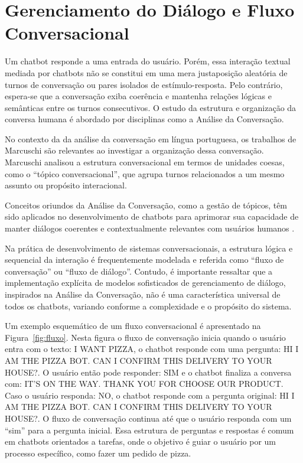 \documentclass[14pt,a4paper,oneside]{book}
\begin{document}
\section{Gerenciamento do Diálogo e Fluxo Conversacional}

Um chatbot responde a uma entrada do usuário. Porém, essa interação textual mediada por chatbots não se constitui em uma mera justaposição aleatória de turnos de conversação ou pares isolados de estímulo-resposta. Pelo contrário, espera-se que a conversação exiba coerência e mantenha relações lógicas e semânticas entre os turnos consecutivos. O estudo da estrutura e organização da conversa humana é abordado por disciplinas como a Análise da Conversação.

No contexto da da análise da conversação em língua portuguesa, os trabalhos de Marcuschi \cite{Marchuschi1986} são relevantes ao investigar a organização dessa conversação. Marcuschi analisou a estrutura conversacional em termos de unidades coesas, como o ``tópico conversacional'', que agrupa turnos relacionados a um mesmo assunto ou propósito interacional.

Conceitos oriundos da Análise da Conversação, como a gestão de tópicos, têm sido aplicados no desenvolvimento de chatbots para aprimorar sua capacidade de manter diálogos coerentes e contextualmente relevantes com usuários humanos \cite{Neves2005}.

Na prática de desenvolvimento de sistemas conversacionais, a estrutura lógica e sequencial da interação é frequentemente modelada e referida como ``fluxo de conversação'' ou ``fluxo de diálogo''. Contudo, é importante ressaltar que a implementação explícita de modelos sofisticados de gerenciamento de diálogo, inspirados na Análise da Conversação, não é uma característica universal de todos os chatbots, variando conforme a complexidade e o propósito do sistema. 

Um exemplo esquemático de um fluxo conversacional é apresentado na Figura~\ref{fig:fluxo}. Nesta figura o fluxo de conversação inicia quando o usuário entra com o texto: I WANT PIZZA, o chatbot responde com uma pergunta: HI I AM THE PIZZA BOT. CAN I CONFIRM THIS DELIVERY TO YOUR HOUSE?. O usuário então pode responder: SIM e o chatbot finaliza a conversa com: IT'S ON THE WAY. THANK YOU FOR CHOOSE OUR PRODUCT. Caso o usuário responda: NO, o chatbot responde com a pergunta original: HI I AM THE PIZZA BOT. CAN I CONFIRM THIS DELIVERY TO YOUR HOUSE?. O fluxo de conversação continua até que o usuário responda com um ``sim'' para a pergunta inicial. Essa estrutura de perguntas e respostas é comum em chatbots orientados a tarefas, onde o objetivo é guiar o usuário por um processo específico, como fazer um pedido de pizza.
\end{document}
